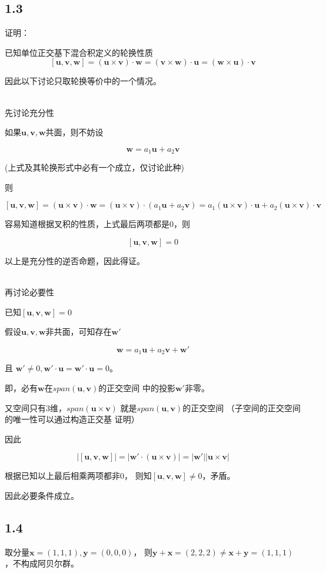 \documentclass[UTF8,zihao=5]{ctexart}
\newcommand{\bm}[1]{{\mathbf{#1}}}
\begin{document}
\subsection*{1.3}
证明：

已知单位正交基下混合积定义的轮换性质
$$
[\bm{u},\bm{v},\bm{w}]=
(\bm{u}\times\bm{v})\cdot\bm{w}
=(\bm{v}\times\bm{w})\cdot\bm{u}
=(\bm{w}\times\bm{u})\cdot\bm{v}
$$

因此以下讨论只取轮换等价中的一个情况。

~\\

先讨论充分性

如果$\bm{u},\bm{v},\bm{w}$共面，则不妨设

$$
\bm{w}=a_1\bm{u}+a_2\bm{v}
$$

(上式及其轮换形式中必有一个成立，仅讨论此种)

则

$$
[\bm{u},\bm{v},\bm{w}]=
(\bm{u}\times\bm{v})\cdot\bm{w}
=(\bm{u}\times\bm{v})\cdot(a_1\bm{u}+a_2\bm{v})
=a_1(\bm{u}\times\bm{v})\cdot\bm{u}+
a_2(\bm{u}\times\bm{v})\cdot\bm{v}
$$

容易知道根据叉积的性质，上式最后两项都是0，则

$$
[\bm{u},\bm{v},\bm{w}]=0
$$

以上是充分性的逆否命题，因此得证。

~\\

再讨论必要性

已知$[\bm{u},\bm{v},\bm{w}]=0$

假设$\bm{u},\bm{v},\bm{w}$非共面，可知存在$\bm{w'}$

$$
\bm{w}=a_1\bm{u}+a_2\bm{v}+\bm{w'}
$$

且
$
\bm{w'}\neq 0, 
\bm{w'}\cdot\bm{u}=\bm{w'}\cdot\bm{u}=0
$。

即，必有$\bm{w}$在$span(\bm{u},\bm{v})$的正交空间
中的投影$\bm{w'}$非零。

又空间只有3维，$span(\bm{u}\times\bm{v})$
就是$span(\bm{u},\bm{v})$的正交空间
（子空间的正交空间的唯一性可以通过构造正交基
证明）

因此

$$
\left|[\bm{u},\bm{v},\bm{w}]\right|
=\left|\bm{w'}\cdot(\bm{u}\times\bm{v})\right|
=|\bm{w'}||\bm{u}\times\bm{v}|
$$

根据已知以上最后相乘两项都非0，
则知$[\bm{u},\bm{v},\bm{w}]\neq 0$，矛盾。

因此必要条件成立。

\subsection*{1.4}
取分量$\bm{x}=(1,1,1), \bm{y}=(0,0,0)$，
则$\bm{y}+\bm{x}=(2,2,2)\neq\bm{x}+\bm{y}=(1,1,1)$，不构成阿贝尔群。
\end{document}
